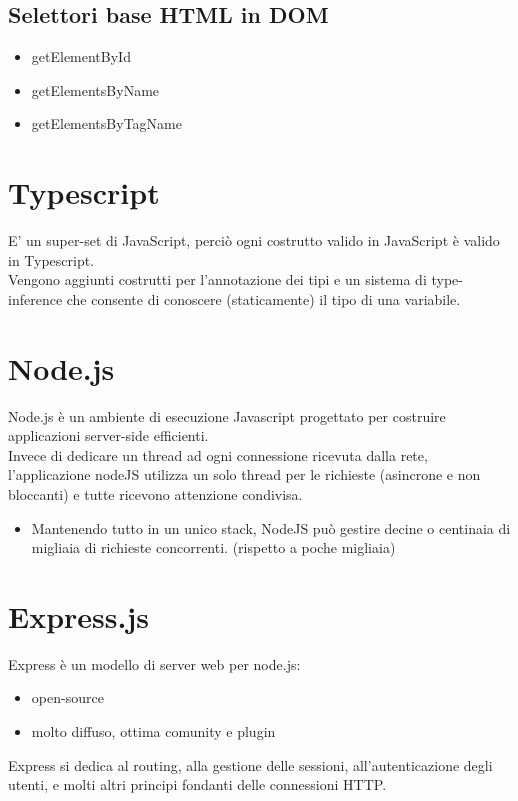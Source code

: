 \documentclass[a4paper,12pt]{article}
\begin{document}
\subsection{Selettori base HTML in DOM}
\begin{itemize}
    \item getElementById
    \item getElementsByName
    \item getElementsByTagName 
\end{itemize}
\section{Typescript}
E' un super-set di JavaScript, perciò ogni costrutto valido in JavaScript è valido in Typescript. \\
Vengono aggiunti costrutti per l’annotazione dei tipi e un sistema di type-inference che consente di conoscere (staticamente) il tipo di una variabile.
\section{Node.js}
Node.js è un ambiente di esecuzione Javascript progettato per costruire applicazioni server-side efficienti. \\
Invece di dedicare un thread ad ogni connessione ricevuta dalla rete, l'applicazione nodeJS utilizza un solo thread per le richieste (asincrone e non bloccanti) e tutte ricevono attenzione condivisa.
\begin{itemize}
    \item Mantenendo tutto in un unico stack, NodeJS può gestire decine o centinaia di migliaia di richieste concorrenti. (rispetto a poche migliaia)
\end{itemize}
\section{Express.js}
Express è un modello di server web per node.js:
\begin{itemize}
    \item open-source
    \item molto diffuso, ottima comunity e plugin
\end{itemize}
Express si dedica al routing, alla gestione delle sessioni, all'autenticazione degli utenti, e molti altri principi fondanti delle connessioni HTTP.
\end{document}
